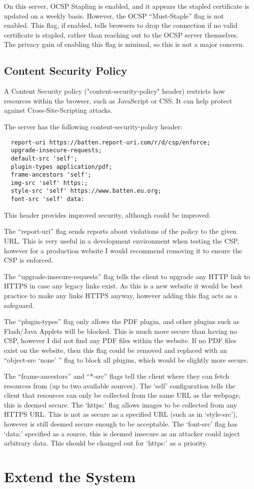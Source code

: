 \documentclass[12pt]{article}
\begin{document}
  On this server, OCSP Stapling is enabled, and it appears the stapled certificate is updated on a weekly basis.
  However, the OCSP ``Must-Staple'' flag is not enabled.
  This flag, if enabled, tells browsers to drop the connection if no valid certificate is stapled, rather than reaching out to the OCSP server themselves.
  The privacy gain of enabling this flag is minimal, so this is not a major concern.

  \subsection{Content Security Policy}
  A Content Security policy ("content-security-policy" header) restricts how resources within the browser, such as JavaScript or CSS.
  It can help protect against Cross-Site-Scripting attacks.

  The server has the following content-security-policy header:
  \begin{verbatim}
  report-uri https://batten.report-uri.com/r/d/csp/enforce; 
  upgrade-insecure-requests; 
  default-src 'self'; 
  plugin-types application/pdf; 
  frame-ancestors 'self'; 
  img-src 'self' https:; 
  style-src 'self' https://www.batten.eu.org; 
  font-src 'self' data:
  \end{verbatim}

  This header provides improved security, although could be improved.

  The ``report-uri'' flag sends reports about violations of the policy to the given URL.
  This is very useful in a development environment when testing the CSP, however for a production website I would recommend removing it to ensure the CSP is enforced.

  The ``upgrade-insecure-requests'' flag tells the client to upgrade any HTTP link to HTTPS in case any legacy links exist.
  As this is a new website it would be best practice to make any links HTTPS anyway, however adding this flag acts as a safeguard.

  The ``plugin-types'' flag only allows the PDF plugin, and other plugins such as Flash/Java Applets will be blocked.
  This is much more secure than having no CSP, however I did not find any PDF files within the website.
  If no PDF files exist on the website, then this flag could be removed and replaced with an ``object-src `none' '' flag to block all plugins, which would be slightly more secure.

  The ``frame-ancestors'' and ``*-src'' flags tell the client where they can fetch resources from (up to two available sources).
  The `self' configuration tells the client that resources can only be collected from the same URL as the webpage, this is deemed secure.
  The `https:' flag allows images to be collected from any HTTPS URL.
  This is not as secure as a specified URL (such as in `style-src'), however is still deemed secure enough to be acceptable.
  The `font-src' flag has `data:' specified as a source, this is deemed insecure as an attacker could inject arbitrary data.
  This should be changed out for `https:' as a priority.

  \section{Extend the System}
\end{document}
